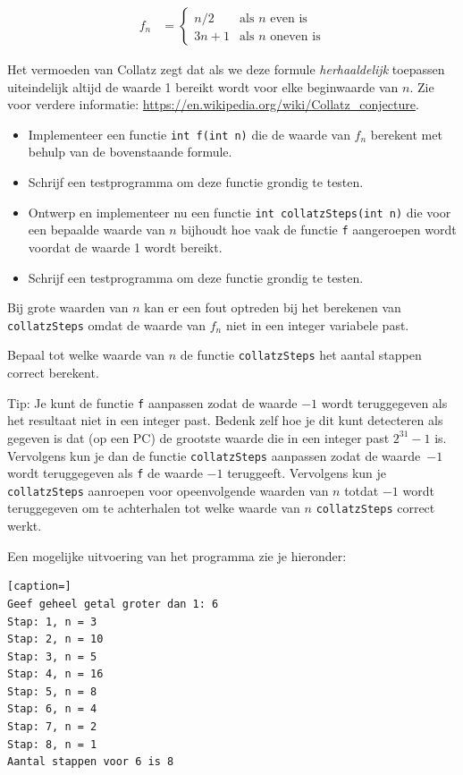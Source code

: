 \documentclass[a4paper,10pt,fleqn,twoside]{article}
\begin{document}
\begin{align*}
f_n &= \begin{cases}
n/2 &\text{als } n \text{ even is} \\
3n+1 &\text{als } n \text{ oneven is}
\end{cases}
\end{align*}

Het vermoeden van Collatz zegt dat als we deze formule \textsl{herhaaldelijk} toepassen uiteindelijk altijd de waarde 1 bereikt wordt voor elke beginwaarde van $n$. Zie voor verdere informatie: \url{https://en.wikipedia.org/wiki/Collatz_conjecture}. 

\begin{itemize}
\item Implementeer een functie \lstinline|int f(int n)| die de waarde van $f_n$ berekent met behulp van de bovenstaande formule.
\item Schrijf een testprogramma om deze functie grondig te testen.
\item Ontwerp en implementeer nu een functie \lstinline|int collatzSteps(int n)| die voor een bepaalde waarde van $n$ bijhoudt hoe vaak de functie \lstinline|f| aangeroepen wordt voordat de waarde 1 wordt bereikt.
\item Schrijf een testprogramma om deze functie grondig te testen.
\end{itemize}

Bij grote waarden van $n$ kan er een fout optreden bij het berekenen van \lstinline|collatzSteps| omdat de waarde van $f_n$ niet in een integer variabele past. 

Bepaal tot welke waarde van $n$ de functie \lstinline|collatzSteps| het aantal stappen correct berekent.

Tip: Je kunt de functie \lstinline|f| aanpassen zodat de waarde $-1$ wordt teruggegeven als het resultaat niet in een integer past. Bedenk zelf hoe je dit kunt detecteren als gegeven is dat (op een PC) de grootste waarde die in een integer past $2^{31}-1$ is. Vervolgens kun je dan de functie \lstinline|collatzSteps| aanpassen zodat de waarde~$-1$ wordt teruggegeven als \lstinline|f| de waarde $-1$ teruggeeft. Vervolgens kun je \lstinline|collatzSteps| aanroepen voor opeenvolgende waarden van $n$ totdat $-1$ wordt teruggegeven om te achterhalen tot welke waarde van $n$ \lstinline|collatzSteps| correct werkt.

Een mogelijke uitvoering van het programma zie je hieronder:

\begin{lstlisting}[caption=]
Geef geheel getal groter dan 1: 6
Stap: 1, n = 3
Stap: 2, n = 10
Stap: 3, n = 5
Stap: 4, n = 16
Stap: 5, n = 8
Stap: 6, n = 4
Stap: 7, n = 2
Stap: 8, n = 1
Aantal stappen voor 6 is 8
\end{lstlisting}
\end{document}
